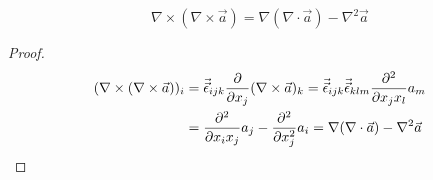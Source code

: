 \begin{proposition}
    \[
    \nabla\times\left(\nabla\times\vec{a}\right)=\nabla\left(\nabla\cdot\vec{a}\right)-\nabla^2\vec{a}
    \]
    \begin{proof}
        \begin{align*}
            (\nabla \times (\nabla \times \vec{a}))_i&= \vec{\vec{\epsilon}}_{ijk} \frac{\partial}{\partial x_j} (\nabla \times \vec{a})_k
            = \vec{\vec{\epsilon}}_{ijk} \vec{\vec{\epsilon}}_{klm} \frac{\partial^2}{\partial x_jx_l}  a_m\\
            &=\frac{\partial^2}{\partial x_ix_j} a_j - \frac{\partial^2}{\partial x_j^2} a_i
            =\nabla (\nabla \cdot \vec{a}) - \nabla^2 \vec{a}
        \end{align*}
    \end{proof}
\end{proposition}











\ifx\allfiles\undefined

\fi
